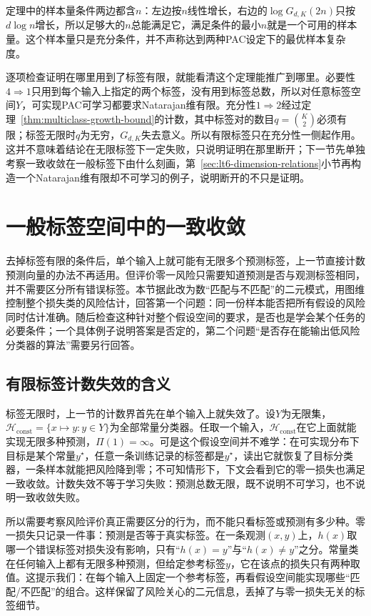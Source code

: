 定理中的样本量条件两边都含$n$：左边按$n$线性增长，右边的$\log G_{d,K}(2n)$只按$d\log n$增长，所以足够大的$n$总能满足它，满足条件的最小$n$就是一个可用的样本量。这个样本量只是充分条件，并不声称达到两种PAC设定下的最优样本复杂度。

逐项检查证明在哪里用到了标签有限，就能看清这个定理能推广到哪里。必要性$4\Rightarrow1$只用到每个输入上指定的两个标签，没有用到标签总数，所以对任意标签空间$Y$，可实现PAC可学习都要求Natarajan维有限。充分性$1\Rightarrow2$经过定理~\ref{thm:multiclass-growth-bound}的计数，其中标签对的数目$q=\binom K2$必须有限；标签无限时$q$为无穷，$G_{d,K}$失去意义。所以有限标签只在充分性一侧起作用。这并不意味着结论在无限标签下一定失败，只说明证明在那里断开；下一节先单独考察一致收敛在一般标签下由什么刻画，第~\ref{sec:lt6-dimension-relations}小节再构造一个Natarajan维有限却不可学习的例子，说明断开的不只是证明。

\section{一般标签空间中的一致收敛}
\label{sec:general-multiclass-dimensions}
\label{sec:multiclass-sample-complexity}

去掉标签有限的条件后，单个输入上就可能有无限多个预测标签，上一节直接计数预测向量的办法不再适用。但评价零一风险只需要知道预测是否与观测标签相同，并不需要区分所有错误标签。本节据此改为数“匹配与不匹配”的二元模式，用图维控制整个损失类的风险估计，回答第一个问题：同一份样本能否把所有假设的风险同时估计准确。随后检查这种针对整个假设空间的要求，是否也是学会某个任务的必要条件；一个具体例子说明答案是否定的，第二个问题“是否存在能输出低风险分类器的算法”需要另行回答。

\subsection{有限标签计数失效的含义}
\label{sec:lt6-counting-failure}

标签无限时，上一节的计数界首先在单个输入上就失效了。设$Y$为无限集，$\mathcal H_{\mathrm{const}}=\{x\mapsto y:y\in Y\}$为全部常量分类器。任取一个输入，$\mathcal H_{\mathrm{const}}$在它上面就能实现无限多种预测，$\Pi(1)=\infty$。可是这个假设空间并不难学：在可实现分布下目标是某个常量$y^\star$，任意一条训练记录的标签都是$y^\star$，读出它就恢复了目标分类器，一条样本就能把风险降到零；不可知情形下，下文会看到它的零一损失也满足一致收敛。计数失效不等于学习失败：预测总数无限，既不说明不可学习，也不说明一致收敛失败。

所以需要考察风险评价真正需要区分的行为，而不能只看标签或预测有多少种。零一损失只记录一件事：预测是否等于真实标签。在一条观测$(x,y)$上，$h(x)$取哪一个错误标签对损失没有影响，只有“$h(x)=y$”与“$h(x)\neq y$”之分。常量类在任何输入上都有无限多种预测，但给定参考标签$y$，它在该点的损失只有两种取值。这提示我们：在每个输入上固定一个参考标签，再看假设空间能实现哪些“匹配/不匹配”的组合。这样保留了风险关心的二元信息，丢掉了与零一损失无关的标签细节。

